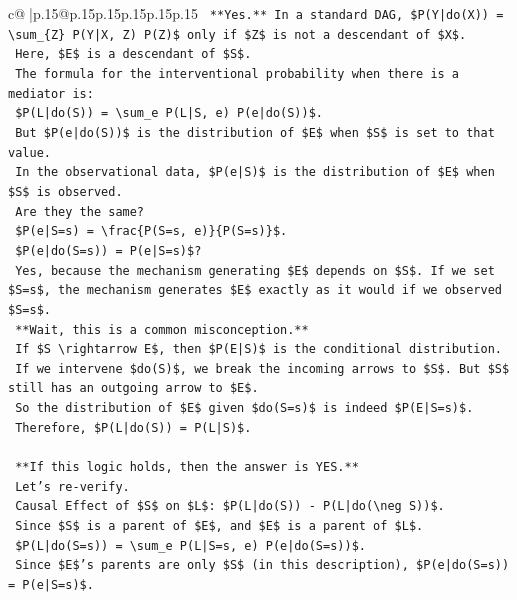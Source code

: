 \documentclass{article}
\begin{document}
{\begin{supertabular}{c@{$\;$}|p{.15\linewidth}@{}p{.15\linewidth}p{.15\linewidth}p{.15\linewidth}p{.15\linewidth}p{.15\linewidth}}
{{{\texttt{    **Yes.** In a standard DAG, \$P(Y|do(X)) = \textbackslash{}sum\_\{Z\} P(Y|X, Z) P(Z)\$ only if \$Z\$ is not a descendant of \$X\$.} \\
\texttt{    Here, \$E\$ is a descendant of \$S\$.} \\
\texttt{    The formula for the interventional probability when there is a mediator is:} \\
\texttt{    \$P(L|do(S)) = \textbackslash{}sum\_e P(L|S, e) P(e|do(S))\$.} \\
\texttt{    But \$P(e|do(S))\$ is the distribution of \$E\$ when \$S\$ is set to that value.} \\
\texttt{    In the observational data, \$P(e|S)\$ is the distribution of \$E\$ when \$S\$ is observed.} \\
\texttt{    Are they the same?} \\
\texttt{    \$P(e|S=s) = \textbackslash{}frac\{P(S=s, e)\}\{P(S=s)\}\$.} \\
\texttt{    \$P(e|do(S=s)) = P(e|S=s)\$?} \\
\texttt{    Yes, because the mechanism generating \$E\$ depends on \$S\$. If we set \$S=s\$, the mechanism generates \$E\$ exactly as it would if we observed \$S=s\$.} \\
\texttt{    **Wait, this is a common misconception.**} \\
\texttt{    If \$S \textbackslash{}rightarrow E\$, then \$P(E|S)\$ is the conditional distribution.} \\
\texttt{    If we intervene \$do(S)\$, we break the incoming arrows to \$S\$. But \$S\$ still has an outgoing arrow to \$E\$.} \\
\texttt{    So the distribution of \$E\$ given \$do(S=s)\$ is indeed \$P(E|S=s)\$.} \\
\texttt{    Therefore, \$P(L|do(S)) = P(L|S)\$.} \\
\\ 
\texttt{    **If this logic holds, then the answer is YES.**} \\
\texttt{    Let's re{-}verify.} \\
\texttt{    Causal Effect of \$S\$ on \$L\$: \$P(L|do(S)) {-} P(L|do(\textbackslash{}neg S))\$.} \\
\texttt{    Since \$S\$ is a parent of \$E\$, and \$E\$ is a parent of \$L\$.} \\
\texttt{    \$P(L|do(S=s)) = \textbackslash{}sum\_e P(L|S=s, e) P(e|do(S=s))\$.} \\
\texttt{    Since \$E\$'s parents are only \$S\$ (in this description), \$P(e|do(S=s)) = P(e|S=s)\$.} \\
}}}
\end{supertabular}}
\end{document}
